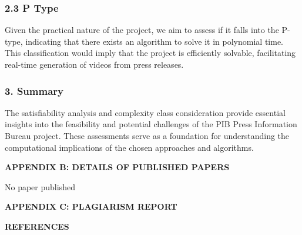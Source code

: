 \documentclass[12pt]{article}
\begin{document}
\subsubsection*{2.3 P Type}

Given the practical nature of the project, we aim to assess if it falls into the P-type, indicating that there exists an algorithm to solve it in polynomial time. This classification would imply that the project is efficiently solvable, facilitating real-time generation of videos from press releases.

\subsubsection*{3. Summary}

The satisfiability analysis and complexity class consideration provide essential insights into the feasibility and potential challenges of the PIB Press Information Bureau project. These assessments serve as a foundation for understanding the computational implications of the chosen approaches and algorithms.


\pagebreak{}

\begin{center} \textbf{APPENDIX B: DETAILS OF PUBLISHED PAPERS} \end{center}

No paper published



\pagebreak{}

\begin{center} \fontsize{12}{12}\textbf{APPENDIX C: PLAGIARISM REPORT} \end{center}



\pagebreak{}
 \begin{center} \textbf{REFERENCES } \end{center}
\end{document}
